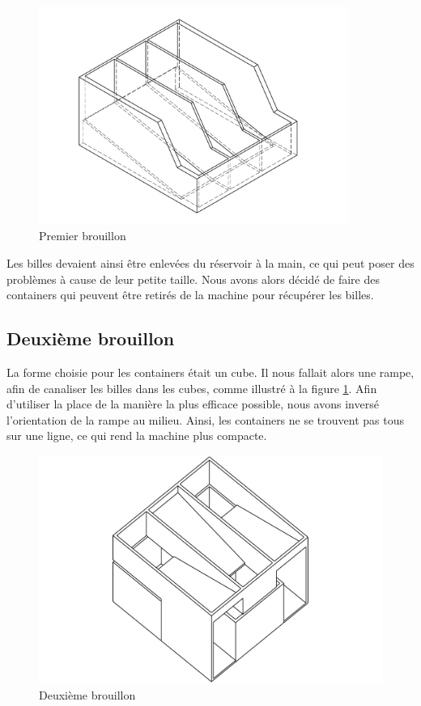 \begin{figure}
    \centering
    \includegraphics[width=0.9\textwidth]{Graphics/Reservoir_final/PREMIER_BROUILLON.pdf}
    \caption{Premier brouillon}
\end{figure}

Les billes devaient ainsi être enlevées du réservoir à la main, ce qui peut poser des problèmes à cause de leur petite taille. Nous avons alors décidé de faire des containers qui peuvent être retirés de la machine pour récupérer les billes.

\subsection{Deuxième brouillon}
La forme choisie pour les containers était un cube. Il nous fallait alors une rampe, afin de canaliser les billes dans les cubes, comme illustré à la figure \ref{fig:B2}. Afin d'utiliser la place de la manière la plus efficace possible, nous avons inversé l'orientation de la rampe au milieu. Ainsi, les containers ne se trouvent pas tous sur une ligne, ce qui rend la machine plus compacte. 

\begin{figure}
    \centering
    \includegraphics[width=\textwidth]{Graphics/Reservoir_final/DEUXIEME_BROUILLON.pdf}
    \caption{Deuxième brouillon}
    \label{fig:B2}
\end{figure}

